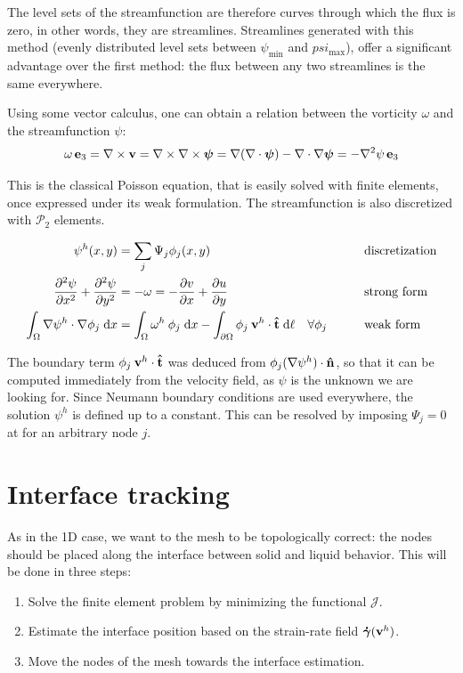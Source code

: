 \documentclass[11 pt]{report}
\begin{document}
The level sets of the streamfunction are therefore curves through which the flux is zero, in other words, they are streamlines. Streamlines generated with this method (evenly distributed level sets between $\psi_{\min}$ and $psi_{\max}$), offer a significant advantage over the first method: the flux between any two streamlines is the same everywhere.

Using some vector calculus, one can obtain a relation between the vorticity $\omega$ and the streamfunction $\psi$:
\begin{equation}
    \omega \,\mathbf{e}_3 = \nabla \times \mathbf{v} = \nabla \times \nabla \times \boldsymbol\psi = \nabla (\nabla \cdot \boldsymbol\psi) - \nabla \cdot \nabla \boldsymbol\psi = - \nabla^2 \psi \,\mathbf{e}_3
\end{equation}

This is the classical Poisson equation, that is easily solved with finite elements, once expressed under its weak formulation. The streamfunction is also discretized with $\mathcal{P}_2$ elements.
\begin{empheqboxed}
    \begin{equation}
        \begin{aligned}
            \psi^h(x,y) &= \sum_{j} \Psi_j \phi_j(x,y) && \text{discretization}\\
            \pdv[2]{\psi}{x} + \pdv[2]{\psi}{y} &= -\omega = -\pdv{v}{x} + \pdv{u}{y} && \text{strong form}\\
            \int_{\Omega} \nabla \psi^h \cdot \nabla \phi_j \;\dd x &= \int_{\Omega} \omega^h \:\phi_j\; \dd x - \int_{\partial \Omega} \phi_j \: \mathbf{v}^h \cdot \mathbf{\hat t} \;\dd \ell \quad \forall \phi_j\qquad && \text{weak form}
        \end{aligned}
    \end{equation}
\end{empheqboxed}
The boundary term $\phi_j \:\mathbf{v}^h\cdot \mathbf{\hat t}$ was deduced from $\phi_j (\nabla \psi^h) \cdot \mathbf{\hat n} $, so that it can be computed immediately from the velocity field, as $\psi$ is the unknown we are looking for. Since Neumann boundary conditions are used everywhere, the solution $\psi^h$ is defined up to a constant. This can be resolved by imposing $\Psi_j=0$ at for an arbitrary node $j$.

\section{Interface tracking}
As in the 1D case, we want to the mesh to be topologically correct: the nodes should be placed along the interface between solid and liquid behavior. This will be done in three steps:
\begin{enumerate}
    \item Solve the finite element problem by minimizing the functional $\mathcal{J}$.
    \item Estimate the interface position based on the strain-rate field $\boldsymbol{\dot \gamma}(\mathbf{v}^h)$.
    \item Move the nodes of the mesh towards the interface estimation.
\end{enumerate}
\end{document}
